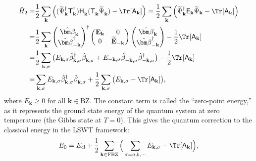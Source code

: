 \begin{align}
    \hat{H}_{2}
    = & \frac{1}{2} \sum_{\mathbf{k}} 
    \Big( (\widetilde{\Psi}^{\dagger}_{\mathbf{k}} \mathsf{T}_{\mathbf{k}}^{\dagger}) \mathsf{H}_{\mathbf{k}}^{\phantom \dagger} (\mathsf{T}_{\mathbf{k}}^{\phantom \dagger} \widetilde{\Psi}_{\mathbf{k}}^{\phantom \dagger} )- \Tr [\mathsf{A}_{\mathbf{k}}] \Big) 
    = \frac{1}{2} \sum_{\mathbf{k}} 
    \Big( \widetilde{\Psi}^{\dagger}_{\mathbf{k}} \mathsf{E}_{\mathbf{k}} \widetilde{\Psi}_{\mathbf{k}} - \Tr [\mathsf{A}_{\mathbf{k}}] \Big) \nonumber \\
    = & \frac{1}{2} \sum_{\mathbf{k}} 
    \begin{pmatrix}
        \hat{\bm \beta}_{\mathbf{k}} \\
        \hat{\bm \beta}_{-\mathbf{k}}^{\dagger}
    \end{pmatrix}^{\dagger}
    \begin{pmatrix}
        \mathbf{E}_{\mathbf{k}} & 0 \\ 0 & \widetilde{\mathbf{E}}_{-\mathbf{k}}
    \end{pmatrix}
    \begin{pmatrix}
        \hat{\bm \beta}_{\mathbf{k}} \\
        \hat{\bm \beta}_{-\mathbf{k}}^{\dagger}
    \end{pmatrix} 
    - \frac{1}{2} \Tr [\mathsf{A}_{\mathbf{k}}]
    \nonumber \\
    = & \frac{1}{2} \sum_{\mathbf{k}, \sigma} 
    \big( 
        E_{\mathbf{k}, \sigma} \hat{\beta}^{\dagger}_{\mathbf{k}, \sigma}   \hat{\beta}^{\phantom \dagger}_{\mathbf{k}, \sigma} +
        E_{-\mathbf{k}, \sigma} \hat{\beta}^{\phantom \dagger}_{-\mathbf{k}, \sigma} \hat{\beta}^{\dagger}_{-\mathbf{k}, \sigma}
    \big) 
    - \frac{1}{2} \Tr [\mathsf{A}_{\mathbf{k}}] \\
    = & \sum_{\mathbf{k}, \sigma} E_{\mathbf{k}, \sigma} \hat{\beta}_{\mathbf{k}, \sigma}^{\dagger} \hat{\beta}_{\mathbf{k}, \sigma}^{\phantom \dagger} 
    + \frac{1}{2} \sum_{\mathbf{k}, \sigma} \big( E_{\mathbf{k}, \sigma} - \Tr [\mathsf{A}_{\mathbf{k}}] \big),
\end{align}
where $E_{\mathbf{k}} \ge 0$ for all $\mathbf{k} \in \mathrm{BZ}$. 
The constant term is called the ``zero-point energy,'' as it represents the ground state energy of the quantum system at zero temperature (the Gibbs state at $T=0$).
This gives the quantum correction to the classical energy in the LSWT framework:
\begin{equation}\label{eq: def. of zero point energy}
    E_{0} = E_{\rm cl} + \frac{1}{2} \sum_{\mathbf{k} \in \mathrm{FBZ}} \Big( \sum_{\sigma=a,b,\cdots} E_{\mathbf{k}, \sigma} -  \Tr[\mathsf{A}_{\mathbf{k}}] \Big),
\end{equation}

